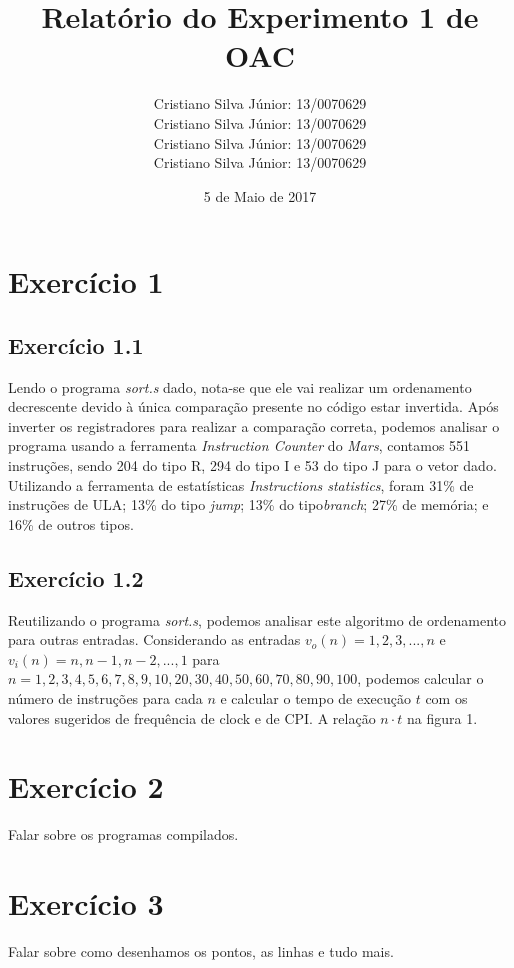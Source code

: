 \documentclass[12pt, a4paper, twoside]{article}
\begin{document}
\title{Relatório do Experimento 1 de OAC}
\author{
Cristiano Silva Júnior: 13/0070629 \\
Cristiano Silva Júnior: 13/0070629 \\
Cristiano Silva Júnior: 13/0070629 \\
Cristiano Silva Júnior: 13/0070629}
\date{5 de Maio de 2017}
\maketitle

\section{Exercício 1}

\subsection{Exercício 1.1}

Lendo o programa \textit{sort.s} dado, nota-se que ele vai realizar um  ordenamento decrescente devido à única comparação presente no código estar  invertida. Após inverter os registradores para realizar a comparação correta, podemos analisar o programa usando a ferramenta \textit{Instruction Counter} do \textit{Mars}, contamos 551 instruções, sendo 204 do tipo R, 294 do tipo I e 53 do tipo J para o vetor dado. Utilizando a ferramenta de estatísticas \textit{Instructions statistics}, foram 31\% de instruções de ULA; 13\% do tipo \textit{jump}; 13\% do tipo\textit{branch}; 27\% de memória; e 16\% de outros tipos.

\subsection{Exercício 1.2}

Reutilizando o programa \textit{sort.s}, podemos analisar este algoritmo de ordenamento para outras entradas. Considerando as entradas $v_o(n) = {1,2,3,...,n}$ e $v_i(n)={n,n-1,n-2,...,1}$ para $n={1,2,3,4,5,6,7,8,9,10,20,30,40,50,60,70,80,90,100}$, podemos calcular o número de instruções para cada $n$ e calcular o tempo de execução $t$ com os valores sugeridos de frequência de clock e de CPI. A relação $n \cdot t$ na figura 1.


\section{Exercício 2}

Falar sobre os programas compilados.

\section{Exercício 3}

Falar sobre como desenhamos os pontos, as linhas e tudo mais.
\end{document}
